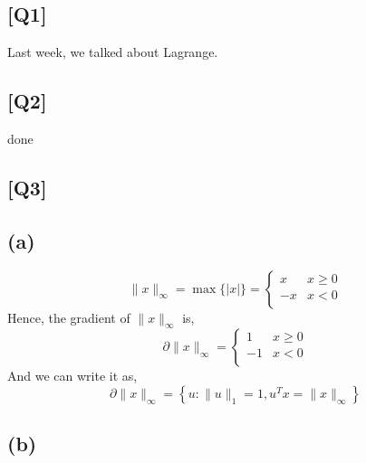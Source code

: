 \documentclass[12pt, a4 paper]{article}
\begin{document}
    \begin{framed}
        \section{[Q1]}
        Last week, we talked about Lagrange.
    \end{framed}

    \begin{framed}
        \section{[Q2]}
        done
    \end{framed}

    \begin{framed}
        \section{[Q3]}
        \subsection{(a)}
        \begin{equation}
            \lVert x \rVert_{\infty} = \max{\{ \lvert x \rvert \}}
            = \left\{
                \begin{array}{lcl}
                x      & {x      \geq      0}\\
                -x     & {x      <      0}\\
                \end{array} \right. 
        \end{equation}
        \indent Hence, the gradient of $\lVert x \rVert_{\infty}$ is,
        \begin{equation}
            \partial \lVert x \rVert_{\infty} 
            = \left\{\begin{array}{lcl}
                1      & {x      \geq      0}\\
                -1     & {x      <      0}\\
            \end{array} \right. 
        \end{equation}
        \indent And we can write it as,
        \begin{equation}
            \partial \lVert x \rVert_{\infty} = \left\{
                u: \lVert u \rVert_{1}=1, u^{T}x = 
                \lVert x \rVert_{\infty}
            \right\}
        \end{equation}

        \subsection{(b)}
        
    \end{framed}
\end{document}
